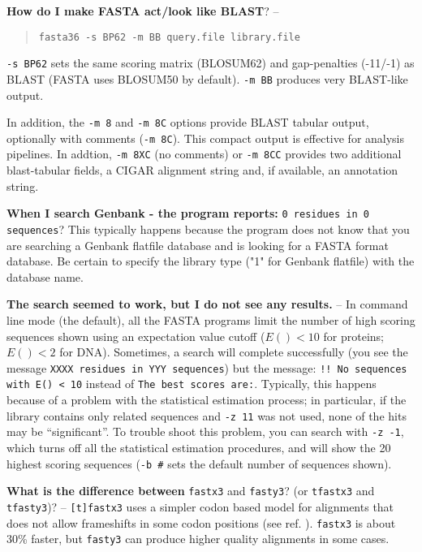\documentclass[11pt]{article}
\begin{document}
\needspace{4 ex}
{\noindent}\textbf{How do I make FASTA act/look like BLAST}? --
\vspace{-0.5ex}
\begin{quote}
\texttt{fasta36 -s BP62 -m BB query.file library.file}
\end{quote}
\vspace{-0.5ex}
\texttt{-s BP62} sets the same scoring matrix (BLOSUM62) and
gap-penalties (-11/-1) as BLAST (FASTA uses BLOSUM50 by
default). \texttt{-m BB} produces very BLAST-like output.

In addition, the \texttt{-m 8} and \texttt{-m 8C} options provide
BLAST tabular output, optionally with comments (\texttt{-m 8C}). This
compact output is effective for analysis pipelines.  In addtion,
\texttt{-m 8XC} (no comments) or \texttt{-m 8CC} provides two
additional blast-tabular fields, a CIGAR alignment string and, if
available, an annotation string.

{\noindent}\textbf{When I search Genbank - the program reports:} \texttt{0 residues in 0
sequences}?  This typically happens because the program does not
know that you are searching a Genbank flatfile database and is looking
for a FASTA format database.  Be certain to specify the library type
("1" for Genbank flatfile) with the database name.

{\noindent}\textbf{The search seemed to work, but I do not see any results.} -- In
command line mode (the default), all the FASTA programs limit the
number of high scoring sequences shown using an expectation value
cutoff ($E()<10$ for proteins; $E()<2$ for DNA).  Sometimes, a search
will complete successfully (you see the message \texttt{XXXX residues
  in YYY sequences}) but the message: \texttt{!! No sequences with E()
  < 10} instead of \texttt{The best scores are:}.  Typically, this
happens because of a problem with the statistical estimation process;
in particular, if the library contains only related sequences and
\texttt{-z 11} was not used, none of the hits may be ``significant''.
To trouble shoot this problem, you can search with \texttt{-z -1},
which turns off all the statistical estimation procedures, and will
show the 20 highest scoring sequences (\texttt{-b \#} sets the default
number of sequences shown).

{\noindent}\textbf{What is the difference between} \texttt{fastx3} and
\texttt{fasty3}? (or \texttt{tfastx3} and \texttt{tfasty3})? --
\texttt{[t]fastx3} uses a simpler codon based model for alignments
that does not allow frameshifts in some codon positions (see
ref. \cite{wrp971}).  \texttt{fastx3} is about 30\% faster, but
\texttt{fasty3} can produce higher quality alignments in some cases.
\end{document}

